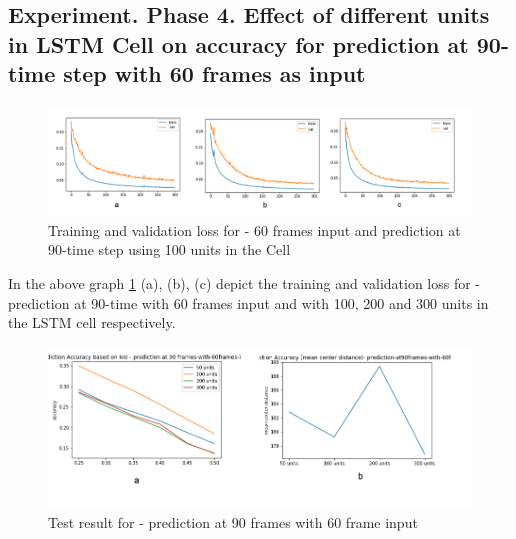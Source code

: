 


\subsection{Experiment. Phase 4. Effect of different units in LSTM Cell on accuracy for prediction at 90-time step with 60 frames as input}

\begin{figure}[H] 
\includegraphics[scale=0.6]{Phase4-training}
\begin{center}
\caption{Training and validation loss for - 60 frames input and prediction at 90-time step using 100 units in the Cell}
\label{fig:Phase4-training}
\end{center}
\end{figure}


In the above graph \ref{fig:Phase4-training} (a), (b), (c) depict the training and validation loss for - prediction at 90-time with 60 frames input and with 100, 200 and 300 units in the LSTM cell respectively. \\

\begin{figure}[H] 
\includegraphics[scale=0.8]{Phase4-accuracy.png}
\begin{center}
\caption{Test result for - prediction at 90 frames with 60 frame input}
\label{Phase4-accuracy}
\end{center}
\end{figure}

